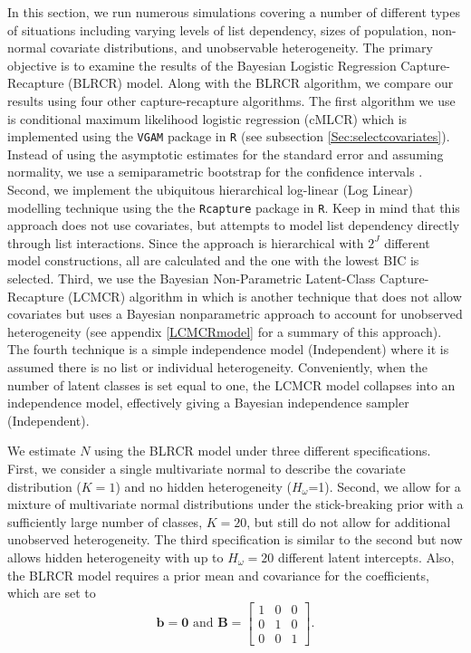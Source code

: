 \documentclass[
  12pt,
]{article}
\begin{document}
In this section, we run numerous simulations covering a number of
different types of situations including varying levels of list
dependency, sizes of population, non-normal covariate distributions, and
unobservable heterogeneity. The primary objective is to examine the
results of the Bayesian Logistic Regression Capture-Recapture (BLRCR)
model. Along with the BLRCR algorithm, we compare our results using four
other capture-recapture algorithms. The first algorithm we use is
conditional maximum likelihood logistic regression (cMLCR) which is
implemented using the \texttt{VGAM} package in \texttt{R} (see
subsection \ref{Sec:selectcovariates}). Instead of using the asymptotic
estimates for the standard error and assuming normality, we use a
semiparametric bootstrap for the confidence intervals
\citep{zwane_implementing_2003}. Second, we implement the ubiquitous
hierarchical log-linear (Log Linear) modelling technique
\citep{fienberg_multiple_1972} using the the \texttt{Rcapture} package
in \texttt{R}. Keep in mind that this approach does not use covariates,
but attempts to model list dependency directly through list
interactions. Since the approach is hierarchical with \(2^J\) different
model constructions, all are calculated and the one with the lowest BIC
is selected. Third, we use the Bayesian Non-Parametric Latent-Class
Capture-Recapture (LCMCR) algorithm in
\cite{manriquevallier_bayesian_2016} which is another technique that
does not allow covariates but uses a Bayesian nonparametric approach to
account for unobserved heterogeneity (see appendix \ref{LCMCRmodel} for
a summary of this approach). The fourth technique is a simple
independence model (Independent) where it is assumed there is no list or
individual heterogeneity. Conveniently, when the number of latent
classes is set equal to one, the LCMCR model collapses into an
independence model, effectively giving a Bayesian independence sampler
(Independent).

We estimate \(N\) using the BLRCR model under three different
specifications. First, we consider a single multivariate normal to
describe the covariate distribution (\(K=1\)) and no hidden
heterogeneity (\(H_\omega\)=1). Second, we allow for a mixture of
multivariate normal distributions under the stick-breaking prior with a
sufficiently large number of classes, \(K=20\), but still do not allow
for additional unobserved heterogeneity. The third specification is
similar to the second but now allows hidden heterogeneity with up to
\(H_\omega=20\) different latent intercepts. Also, the BLRCR model
requires a prior mean and covariance for the coefficients, which are set
to
\[\boldsymbol{b}=\boldsymbol{0} \text{ and } \boldsymbol{B}=\begin{bmatrix}
1 & 0 & 0\\
0 & 1 & 0\\
0 & 0 & 1
\end{bmatrix}.\]
\end{document}
